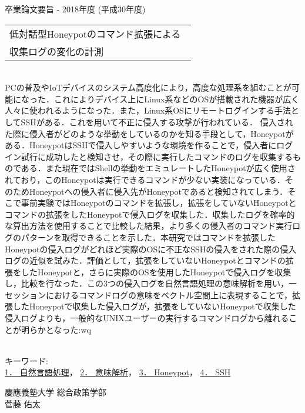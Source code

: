 卒業論文要旨 - 2018年度 (平成30年度)
\begin{center}
\begin{large}
\begin{tabular}{|M{0.97\linewidth}|}
    \hline
   低対話型Honeypotのコマンド拡張による\\収集ログの変化の計測\\
    \hline
\end{tabular}
\end{large}
\end{center}

~ \\

PCの普及やIoTデバイスのシステム高度化により，高度な処理系を組むことが可能になった．これによりデバイス上にLinux系などのOSが搭載された機器が広く人々に使われるようになった．また，Linux系OSにリモートログインする手法としてSSHがある．これを用いて不正に侵入する攻撃が行われている．
侵入された際に侵入者がどのような挙動をしているのかを知る手段として，Honeypotがある．HoneypotはSSHで侵入しやすいような環境を作ることで，侵入者にログイン試行に成功したと検知させ，その際に実行したコマンドのログを収集するものである．また現在ではShellの挙動をエミュレートしたHoneypotが広く使用されており，このHoneypotは実行できるコマンドが少ない実装になっている．そのためHoneypotへの侵入者に侵入先がHoneypotであると検知されてしまう．そこで事前実験ではHoneypotのコマンドを拡張し，拡張をしていないHoneypotとコマンドの拡張をしたHoneypotで侵入ログを収集した．収集したログを確率的な算出方法を使用することで比較した結果，より多くの侵入者のコマンド実行ログのパターンを取得できることを示した．本研究ではコマンドを拡張したHoneypotの侵入ログがどれほど実際のOSに不正なSSHの侵入をされた際の侵入ログの近似を試みた．評価として，拡張をしていないHoneypotとコマンドの拡張をしたHoneypotと，さらに実際のOSを使用したHoneypotで侵入ログを収集し，比較を行なった．この3つの侵入ログを自然言語処理の意味解析を用い，一セッションにおけるコマンドログの意味をベクトル空間上に表現することで，拡張したHoneypotで収集した侵入ログが，拡張をしていないHoneypotで収集した侵入ログよりも，一般的なUNIXユーザーの実行するコマンドログから離れることが明らかとなった:wq

~ \\
キーワード:\\
\underline{1． 自然言語処理}，
\underline{2． 意味解析}，
\underline{3． Honeypot}，
\underline{4． SSH}
\begin{flushright}
慶應義塾大学 総合政策学部\\
菅藤 佑太
\end{flushright}
